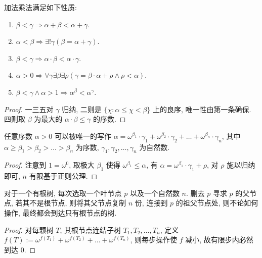\begin{lemma}
    加法乘法满足如下性质:

    \begin{enumerate}
        \item \(\beta < \gamma \Rightarrow \alpha + \beta < \alpha + \gamma\).
        \item \(\alpha < \beta \Rightarrow \exists ! \gamma (\beta = \alpha + \gamma)\).
        \item \(\beta < \gamma \Rightarrow \alpha \cdot \beta < \alpha \cdot \gamma\).
        \item \(\alpha > 0 \Rightarrow \forall \gamma \exists \beta \exists \rho (\gamma = \beta \cdot \alpha + \rho \wedge \rho < \alpha)\).
        \item \(\beta < \gamma \wedge \alpha > 1 \Rightarrow \alpha^\beta < \alpha^\gamma\).
    \end{enumerate}

    \begin{proof}
        一三五对 \(\gamma\) 归纳, 二则是 \(\{\chi : \alpha \le \chi < \beta\}\) 上的良序, 唯一性由第一条确保.
        四则取 \(\beta\) 为最大的 \(\alpha \cdot \beta \le \gamma\) 的序数.
    \end{proof}
\end{lemma}

\begin{theorem*}
     任意序数 \(\alpha > 0\) 可以被唯一的写作
    \(\alpha = \omega^{\beta_1} \cdot \gamma_1 + \omega^{\beta_2} \cdot \gamma_2 + \dots + \omega^{\beta_n} \cdot \gamma_n\),
    其中 \(\alpha \ge \beta_1 > \beta_2 > \dots > \beta_n\) 为序数, \(\gamma_1, \gamma_2, \dots, \gamma_n\) 为自然数.

    \begin{proof}
        注意到 \(1 = \omega^0\), 取极大 \(\beta_1\) 使得 \(\omega^{\beta_1} \le \alpha\), 有 \(\alpha = \omega^{\beta_1} \cdot \gamma_1 + \rho\),
        对 \(\rho\) 施以归纳即可, \(n\) 有限基于正则公理.
    \end{proof}
\end{theorem*}

\begin{example*}
    [Hydra 数] 对于一个有根树, 每次选取一个叶节点 \(p\) 以及一个自然数 \(n\).
    删去 \(p\) 寻求 \(p\) 的父节点, 若其不是根节点, 则将其父节点复制 \(n\) 份,
    连接到 \(p\) 的祖父节点处, 则不论如何操作, 最终都会到达只有根节点的树.

    \begin{proof}
        对每颗树 \(T\), 其根节点连结子树 \(T_1, T_2, \dots, T_n\), 定义 \(f(T) := \omega^{f(T_1)} + \omega^{f(T_2)} + \dots + \omega^{f(T_n)}\),
        则每步操作使 \(f\) 减小, 故有限步内必然到达 \(0\).
    \end{proof}
\end{example*}

